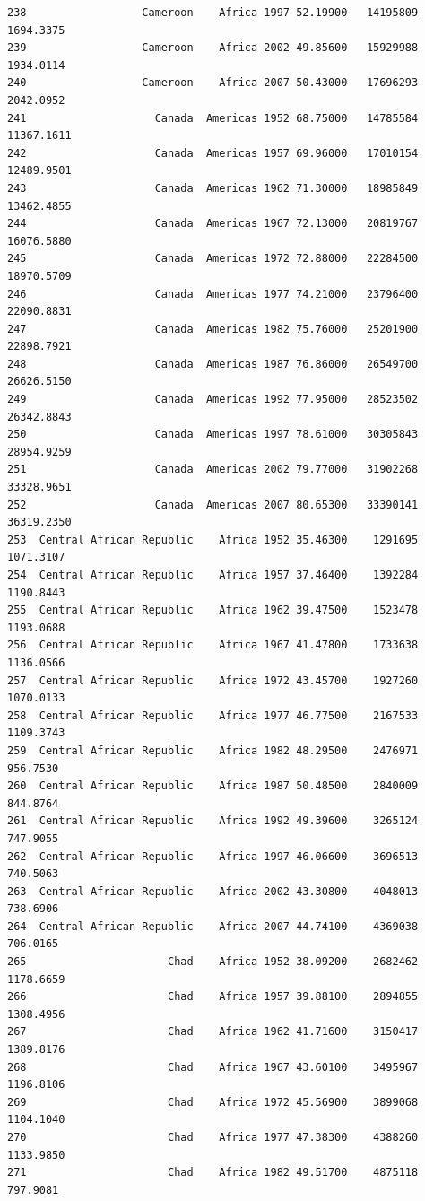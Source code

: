 \documentclass[
  letterpaper,
  DIV=11,
  numbers=noendperiod]{scrreprt}
\begin{document}
\begin{verbatim}
238                  Cameroon    Africa 1997 52.19900   14195809   1694.3375
239                  Cameroon    Africa 2002 49.85600   15929988   1934.0114
240                  Cameroon    Africa 2007 50.43000   17696293   2042.0952
241                    Canada  Americas 1952 68.75000   14785584  11367.1611
242                    Canada  Americas 1957 69.96000   17010154  12489.9501
243                    Canada  Americas 1962 71.30000   18985849  13462.4855
244                    Canada  Americas 1967 72.13000   20819767  16076.5880
245                    Canada  Americas 1972 72.88000   22284500  18970.5709
246                    Canada  Americas 1977 74.21000   23796400  22090.8831
247                    Canada  Americas 1982 75.76000   25201900  22898.7921
248                    Canada  Americas 1987 76.86000   26549700  26626.5150
249                    Canada  Americas 1992 77.95000   28523502  26342.8843
250                    Canada  Americas 1997 78.61000   30305843  28954.9259
251                    Canada  Americas 2002 79.77000   31902268  33328.9651
252                    Canada  Americas 2007 80.65300   33390141  36319.2350
253  Central African Republic    Africa 1952 35.46300    1291695   1071.3107
254  Central African Republic    Africa 1957 37.46400    1392284   1190.8443
255  Central African Republic    Africa 1962 39.47500    1523478   1193.0688
256  Central African Republic    Africa 1967 41.47800    1733638   1136.0566
257  Central African Republic    Africa 1972 43.45700    1927260   1070.0133
258  Central African Republic    Africa 1977 46.77500    2167533   1109.3743
259  Central African Republic    Africa 1982 48.29500    2476971    956.7530
260  Central African Republic    Africa 1987 50.48500    2840009    844.8764
261  Central African Republic    Africa 1992 49.39600    3265124    747.9055
262  Central African Republic    Africa 1997 46.06600    3696513    740.5063
263  Central African Republic    Africa 2002 43.30800    4048013    738.6906
264  Central African Republic    Africa 2007 44.74100    4369038    706.0165
265                      Chad    Africa 1952 38.09200    2682462   1178.6659
266                      Chad    Africa 1957 39.88100    2894855   1308.4956
267                      Chad    Africa 1962 41.71600    3150417   1389.8176
268                      Chad    Africa 1967 43.60100    3495967   1196.8106
269                      Chad    Africa 1972 45.56900    3899068   1104.1040
270                      Chad    Africa 1977 47.38300    4388260   1133.9850
271                      Chad    Africa 1982 49.51700    4875118    797.9081

\end{verbatim}
\end{document}
